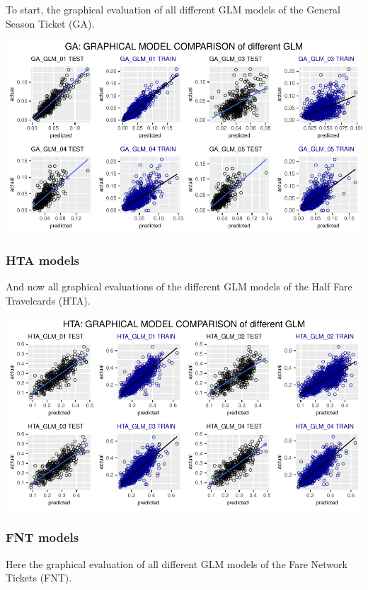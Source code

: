 \documentclass[
]{article}
\begin{document}
To start, the graphical evaluation of all different GLM models of the
General Season Ticket (GA).

\includegraphics{Influence_factors_files/figure-latex/2.28_GA_model_eval_graphically-1.pdf}

\hypertarget{hta-models}{%
\subsubsection{HTA models}\label{hta-models}}

And now all graphical evaluations of the different GLM models of the
Half Fare Travelcards (HTA).

\includegraphics{Influence_factors_files/figure-latex/2.29_HTA_model_eval_graphically-1.pdf}

\hypertarget{fnt-models}{%
\subsubsection{FNT models}\label{fnt-models}}

Here the graphical evaluation of all different GLM models of the Fare
Network Tickets (FNT).
\end{document}

